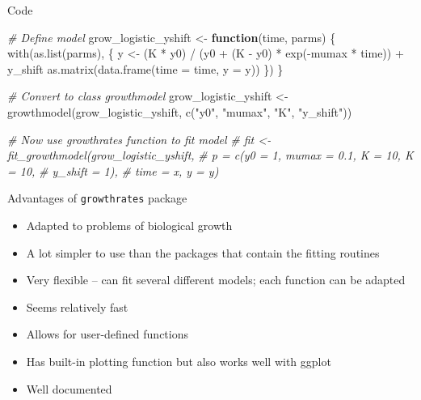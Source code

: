 \documentclass[
  ignorenonframetext,
]{beamer}
\newenvironment{Shaded}{\begin{snugshade}}{\end{snugshade}}
\newcommand{\AttributeTok}[1]{\textcolor[rgb]{0.77,0.63,0.00}{#1}}
\newcommand{\CommentTok}[1]{\textcolor[rgb]{0.56,0.35,0.01}{\textit{#1}}}
\newcommand{\ControlFlowTok}[1]{\textcolor[rgb]{0.13,0.29,0.53}{\textbf{#1}}}
\newcommand{\FunctionTok}[1]{\textcolor[rgb]{0.00,0.00,0.00}{#1}}
\newcommand{\NormalTok}[1]{#1}
\newcommand{\OtherTok}[1]{\textcolor[rgb]{0.56,0.35,0.01}{#1}}
\newcommand{\SpecialCharTok}[1]{\textcolor[rgb]{0.00,0.00,0.00}{#1}}
\newcommand{\StringTok}[1]{\textcolor[rgb]{0.31,0.60,0.02}{#1}}
\providecommand{\tightlist}{%
  \setlength{\itemsep}{0pt}\setlength{\parskip}{0pt}}
\begin{document}
\begin{frame}[fragile]{Code}
\protect\hypertarget{code}{}
\begin{Shaded}
\begin{Highlighting}[]
\CommentTok{\# Define model}
\NormalTok{grow\_logistic\_yshift }\OtherTok{\textless{}{-}} \ControlFlowTok{function}\NormalTok{(time, parms) \{}
  \FunctionTok{with}\NormalTok{(}\FunctionTok{as.list}\NormalTok{(parms), \{}
\NormalTok{    y }\OtherTok{\textless{}{-}}\NormalTok{ (K }\SpecialCharTok{*}\NormalTok{ y0) }\SpecialCharTok{/}\NormalTok{ (y0 }\SpecialCharTok{+}\NormalTok{ (K }\SpecialCharTok{{-}}\NormalTok{ y0) }\SpecialCharTok{*} \FunctionTok{exp}\NormalTok{(}\SpecialCharTok{{-}}\NormalTok{mumax }\SpecialCharTok{*}\NormalTok{ time)) }\SpecialCharTok{+}\NormalTok{ y\_shift}
    \FunctionTok{as.matrix}\NormalTok{(}\FunctionTok{data.frame}\NormalTok{(}\AttributeTok{time =}\NormalTok{ time, }\AttributeTok{y =}\NormalTok{ y))}
\NormalTok{  \})}
\NormalTok{\}}

\CommentTok{\# Convert to class \textasciigrave{}growthmodel\textasciigrave{}}
\NormalTok{grow\_logistic\_yshift }\OtherTok{\textless{}{-}} \FunctionTok{growthmodel}\NormalTok{(grow\_logistic\_yshift,}
                                    \FunctionTok{c}\NormalTok{(}\StringTok{"y0"}\NormalTok{, }\StringTok{"mumax"}\NormalTok{, }\StringTok{"K"}\NormalTok{, }\StringTok{"y\_shift"}\NormalTok{))}

\CommentTok{\# Now use \textasciigrave{}growthrates\textasciigrave{} function to fit model}
\CommentTok{\# fit \textless{}{-} fit\_growthmodel(grow\_logistic\_yshift,}
                       \CommentTok{\# p = c(y0 = 1, mumax = 0.1, K = 10, K = 10, }
                       \CommentTok{\#       y\_shift = 1),}
                       \CommentTok{\# time = x, y = y)}
\end{Highlighting}
\end{Shaded}
\end{frame}

\begin{frame}{Advantages of \texttt{growthrates} package}
\protect\hypertarget{advantages-of-growthrates-package}{}
\begin{itemize}
\tightlist
\item
  Adapted to problems of biological growth
\item
  A lot simpler to use than the packages that contain the fitting
  routines
\item
  Very flexible -- can fit several different models; each function can
  be adapted
\item
  Seems relatively fast
\item
  Allows for user-defined functions
\item
  Has built-in plotting function but also works well with ggplot
\item
  Well documented
\end{itemize}
\end{frame}
\end{document}

